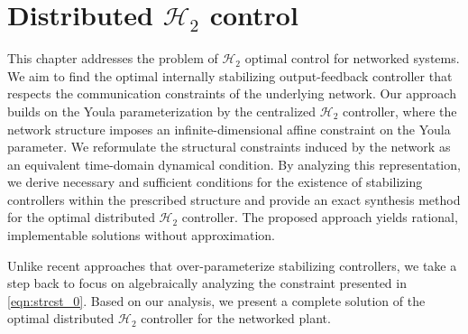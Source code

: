 \chapter{Distributed {$\mathcal{H}_2$} control}
\label{chap:H2ctrl}

This chapter addresses the problem of $\mathcal{H}_2$ optimal control for networked systems. We aim to find the optimal internally stabilizing output-feedback controller that respects the communication constraints of the underlying network. Our approach builds on the Youla parameterization by the centralized \(\mathcal{H}_2\) controller, where the network structure imposes an infinite-dimensional affine constraint on the Youla parameter. We reformulate the structural constraints induced by the network as an equivalent time-domain dynamical condition. By analyzing this representation, we derive necessary and sufficient conditions for the existence of stabilizing controllers within the prescribed structure and provide an exact synthesis method for the optimal distributed $\mathcal{H}_2$ controller. The proposed approach yields rational, implementable solutions without approximation.

Unlike recent approaches that over-parameterize stabilizing controllers, we take a step back to focus on algebraically analyzing the constraint presented in \eqref{eqn:strcst_0}. Based on our analysis, we present a complete solution of the optimal distributed \(\mathcal{H}_2\) controller for the networked plant. 





